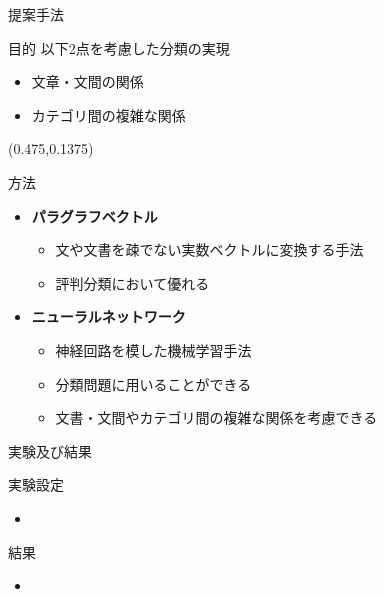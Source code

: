 \documentclass[aspectratio=43,unicode,10pt]{beamer}
\newcommand{\itemtitle}[1]{\textbf{#1}\\}
\begin{document}
\begin{frame}{提案手法}{}
  \begin{block}{目的}
    以下2点を考慮した分類の実現
    \begin{itemize}
      \item 文章・文間の関係
      \item カテゴリ間の複雑な関係
    \end{itemize}
  \end{block}
  \begin{textblock}{0.575}(0.475,0.1375)
    \fboxsep=2mm %
  \end{textblock}
  \begin{block}{方法}
    \begin{itemize}
      \item \itemtitle{パラグラフベクトル}
        \begin{itemize}
          \item 文や文書を疎でない実数ベクトルに変換する手法
          \item 評判分類において優れる
        \end{itemize}
      \item \itemtitle{ニューラルネットワーク}
        \begin{itemize}
          \item 神経回路を模した機械学習手法
          \item 分類問題に用いることができる
          \item 文書・文間やカテゴリ間の複雑な関係を考慮できる
        \end{itemize}
    \end{itemize}
  \end{block}
\end{frame}

\begin{frame}{実験及び結果}{}
  \begin{block}{実験設定}
    \begin{itemize}
      \item
    \end{itemize}
  \end{block}
  \begin{block}{結果}
    \begin{itemize}
      \item
    \end{itemize}
  \end{block}
\end{frame}
\end{document}
